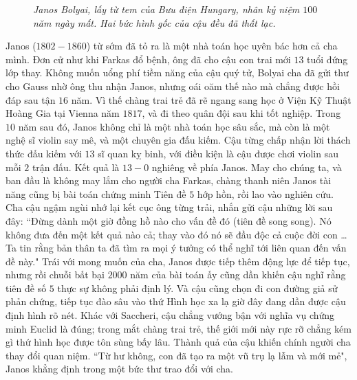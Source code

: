 \begin{multicols}{2}
\begin{figure}[H]
		\caption{\small\textit{\color{lichsutoanhoc}Janos Bolyai, lấy từ tem của Bưu điện Hungary, nhân kỷ niệm $100$ năm ngày mất. Hai bức hình gốc của cậu đều đã thất lạc.}}
		\vspace*{-10pt}
	\end{figure}
	Janos ($1802-1860$) từ sớm đã tỏ ra là một nhà toán học uyên bác hơn cả cha mình. Đơn cử như khi Farkas đổ bệnh, ông đã cho cậu con trai mới $13$ tuổi đứng lớp thay. Không muốn uổng phí tiềm năng của cậu quý tử, Bolyai cha đã gửi thư cho Gauss nhờ ông thu nhận Janos, nhưng oái oăm thế nào mà chẳng được hồi đáp sau tận $16$ năm. Vì thế chàng trai trẻ đã rẽ ngang sang học ở Viện Kỹ Thuật Hoàng Gia tại Vienna năm $1817$, và đi theo quân đội sau khi tốt nghiệp. Trong $10$ năm sau đó, Janos không chỉ là một nhà toán học sâu sắc, mà còn là một nghệ sĩ violin say mê, và một chuyên gia đấu kiếm. Cậu từng chấp nhận lời thách thức đấu kiếm với $13$ sĩ quan kỵ binh, với điều kiện là cậu được chơi violin sau mỗi $2$ trận đấu. Kết quả là $13-0$ nghiêng về phía Janos.
	\vskip 0.1cm
	May cho chúng ta, và ban đầu là không may lắm cho người cha Farkas, chàng thanh niên Janos tài năng cũng bị bài toán chứng minh Tiên đề $5$ hớp hồn, rồi lao vào nghiên cứu. Cha cậu ngậm ngùi nhớ lại kết cục ông từng trải, nhắn gửi cậu những lời sau đây:
	\vskip 0.1cm
	``Đừng dành một giờ đồng hồ nào cho vấn đề đó (tiên đề song song). Nó không đưa đến một kết quả nào cả; thay vào đó nó sẽ đầu độc cả cuộc đời con \ldots Ta tin rằng bản thân ta đã tìm ra mọi ý tưởng có thể nghĩ tới liên quan đến vấn đề này."
	\vskip 0.1cm
	Trái với mong muốn của cha, Janos được tiếp thêm động lực để tiếp tục, nhưng rồi chuỗi bất bại $2000$ năm của bài toán ấy cũng dần khiến cậu nghĩ rằng tiên đề số $5$ thực sự không phải định lý. Và cậu cũng chọn đi con đường giả sử phản chứng, tiếp tục đào sâu vào thứ Hình học xa lạ giờ đây đang dần được cậu định hình rõ nét. Khác với Saccheri, cậu chẳng vướng bận với nghĩa vụ chứng minh Euclid là đúng; trong mắt chàng trai trẻ, thế giới mới này rực rỡ chẳng kém gì thứ hình học được tôn sùng bấy lâu. Thành quả của cậu khiến chính người cha thay đổi quan niệm. ``Từ hư không, con đã tạo ra một vũ trụ lạ lẫm và mới mẻ", Janos khẳng định trong một bức thư trao đổi với cha. 
	\begin{figure}[H]
		\vspace*{-5pt}
		\centering
		\captionsetup{labelformat= empty, justification=centering}

\end{figure}
\end{multicols}
